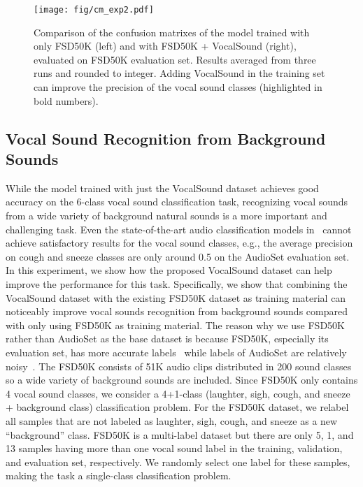 \documentclass{article}
\newcommand{\squeezeup}{\vspace{-1.6mm}}
\begin{document}
\label{exp:exp1}
\begin{figure}[]
  \centering
  \texttt{[image: fig/cm\_exp2.pdf]}
  \caption{Comparison of the confusion matrixes of the model trained with only FSD50K (left) and with FSD50K + VocalSound (right), evaluated on FSD50K evaluation set. Results averaged from three runs and rounded to integer. Adding VocalSound in the training set can improve the precision of the vocal sound classes (highlighted in bold numbers).}
  \label{fig:exp2}
  \squeezeup\squeezeup
\end{figure}

\squeezeup
\subsection{Vocal Sound Recognition from Background Sounds}
\label{sec:exp2}

While the model trained with just the VocalSound dataset achieves good accuracy on the 6-class vocal sound classification task, recognizing vocal sounds from a wide variety of background natural sounds is a more important and challenging task. Even the state-of-the-art audio classification models in~\cite{gong2021psla,kong2020panns} cannot achieve satisfactory results for the vocal sound classes, e.g., the average precision on cough and sneeze classes are only around 0.5 on the AudioSet evaluation set. In this experiment, we show how the proposed VocalSound dataset can help improve the performance for this task. Specifically, we show that combining the VocalSound dataset with the existing FSD50K dataset as training material can noticeably improve vocal sounds recognition from background sounds compared with only using FSD50K as training material. The reason why we use FSD50K rather than AudioSet as the base dataset is because FSD50K, especially its evaluation set, has more accurate labels~\cite{fonseca2020fsd50k} while labels of AudioSet are relatively noisy~\cite{gong2021psla,fonseca2020addressing,shah2018closer}. The FSD50K consists of 51K audio clips distributed in 200 sound classes so a wide variety of background sounds are included. Since FSD50K only contains 4 vocal sound classes, we consider a 4+1-class (laughter, sigh, cough, and sneeze + background class) classification problem. For the FSD50K dataset, we relabel all samples that are not labeled as laughter, sigh, cough, and sneeze as a new ``background'' class. FSD50K is a multi-label dataset but there are only 5, 1, and 13 samples having more than one vocal sound label in the training, validation, and evaluation set, respectively. We randomly select one label for these samples, making the task a single-class classification problem. 
\end{document}
